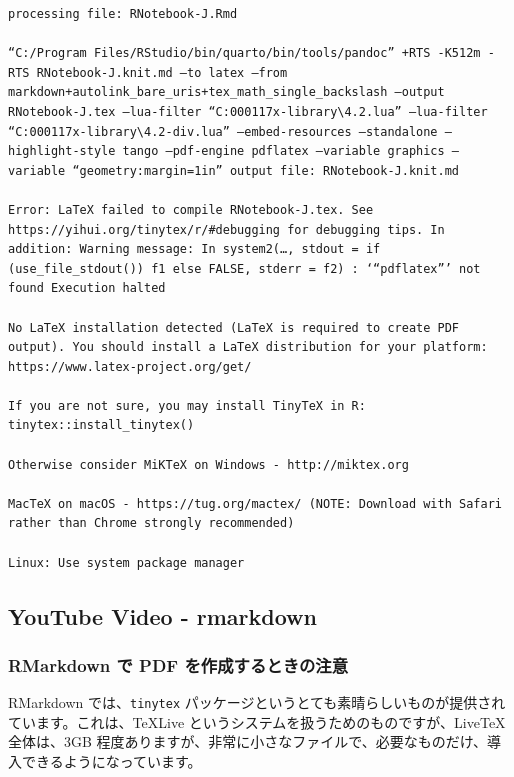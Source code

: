 \documentclass[
]{bxjsbook}
\theoremstyle{definition}
\theoremstyle{definition}
\theoremstyle{definition}
\theoremstyle{definition}
\theoremstyle{remark}
\begin{document}
\begin{verbatim}
processing file: RNotebook-J.Rmd

“C:/Program Files/RStudio/bin/quarto/bin/tools/pandoc” +RTS -K512m -RTS RNotebook-J.knit.md –to latex –from markdown+autolink_bare_uris+tex_math_single_backslash –output RNotebook-J.tex –lua-filter “C:000117x-library\4.2.lua” –lua-filter “C:000117x-library\4.2-div.lua” –embed-resources –standalone –highlight-style tango –pdf-engine pdflatex –variable graphics –variable “geometry:margin=1in” output file: RNotebook-J.knit.md

Error: LaTeX failed to compile RNotebook-J.tex. See https://yihui.org/tinytex/r/#debugging for debugging tips. In addition: Warning message: In system2(…, stdout = if (use_file_stdout()) f1 else FALSE, stderr = f2) : ‘“pdflatex”’ not found Execution halted

No LaTeX installation detected (LaTeX is required to create PDF output). You should install a LaTeX distribution for your platform: https://www.latex-project.org/get/

If you are not sure, you may install TinyTeX in R: tinytex::install_tinytex()

Otherwise consider MiKTeX on Windows - http://miktex.org

MacTeX on macOS - https://tug.org/mactex/ (NOTE: Download with Safari rather than Chrome strongly recommended)

Linux: Use system package manager
\end{verbatim}

\hypertarget{youtube-video---rmarkdown}{%
\subsection{YouTube Video - rmarkdown}\label{youtube-video---rmarkdown}}

\hypertarget{rmarkdown-ux3067-pdf-ux3092ux4f5cux6210ux3059ux308bux3068ux304dux306eux6ce8ux610f}{%
\subsubsection{RMarkdown で PDF を作成するときの注意}\label{rmarkdown-ux3067-pdf-ux3092ux4f5cux6210ux3059ux308bux3068ux304dux306eux6ce8ux610f}}

RMarkdown では、\texttt{tinytex} パッケージというとても素晴らしいものが提供されています。これは、TeXLive というシステムを扱うためのものですが、LiveTeX 全体は、3GB 程度ありますが、非常に小さなファイルで、必要なものだけ、導入できるようになっています。
\end{document}

